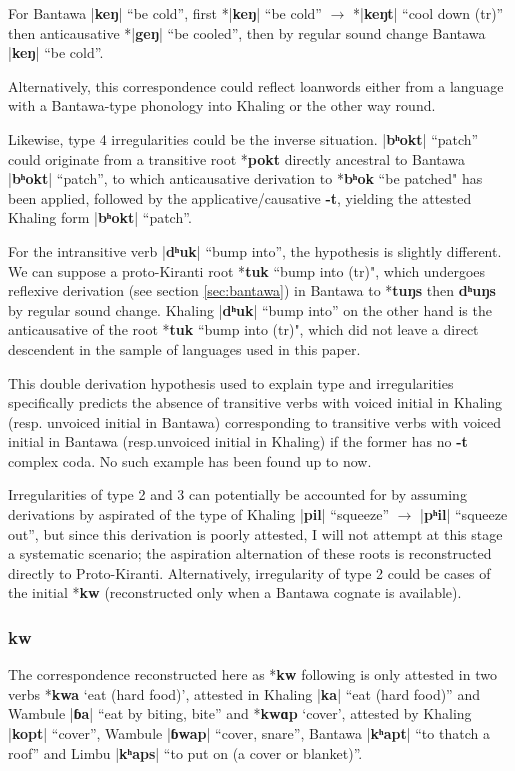 \documentclass[oldfontcommands,oneside,a4paper,11pt]{article}
\newcommand{\ipa}[1]{\textbf{{\phon\mbox{#1}}}} %
\newcommand{\dhatu}[2]{|\ipa{#1}| ``#2''}
\begin{document}
 For Bantawa \dhatu{keŋ}{be cold}, first *\dhatu{keŋ}{be cold} $\rightarrow$ *\dhatu{keŋt}{cool down (tr)} then anticausative *\dhatu{geŋ}{be cooled}, then by regular sound change Bantawa \dhatu{keŋ}{be cold}.
 
 Alternatively, this correspondence could reflect loanwords either from a language with a Bantawa-type phonology into Khaling or the other way round.
 
Likewise, type 4  irregularities could be the inverse situation. \dhatu{bʰokt}{patch} could originate from a transitive root *\ipa{pokt} directly ancestral to Bantawa \dhatu{bʰokt}{patch}, to which anticausative derivation to *\ipa{bʰok} ``be patched" has been applied, followed by the applicative/causative \ipa{-t}, yielding the attested Khaling form \dhatu{bʰokt}{patch}. 

For the intransitive verb \dhatu{dʰuk}{bump into}, the hypothesis is slightly different. We can suppose a proto-Kiranti root *\ipa{tuk} ``bump into (tr)", which undergoes reflexive derivation (see section \ref{sec:bantawa}) in Bantawa to *\ipa{tuŋs} then \ipa{dʰuŋs} by regular sound change. Khaling \dhatu{dʰuk}{bump into} on the other hand is the anticausative of the root *\ipa{tuk} ``bump into (tr)", which did not leave a direct descendent in the sample of languages used in this paper.
 
 This double derivation hypothesis used to explain type  and irregularities specifically predicts the absence of transitive verbs with voiced initial in Khaling (resp. unvoiced initial in Bantawa) corresponding to transitive verbs with voiced initial in Bantawa (resp.unvoiced initial in Khaling) if the former has no \ipa{-t} complex coda. No such example has been found up to now.
 
 Irregularities of type 2 and 3 can potentially be accounted for by assuming derivations by aspirated of the type of Khaling \dhatu{pil}{squeeze} $\rightarrow$ \dhatu{pʰil}{squeeze out}, but since this derivation is poorly attested, I will not attempt at this stage a systematic scenario; the aspiration alternation of these roots is reconstructed directly to Proto-Kiranti. Alternatively, irregularity of type  2 could be cases of the initial *\ipa{kw} (reconstructed only when a Bantawa cognate is available).

\subsubsection{\ipa{kw}}
The correspondence reconstructed here as *\ipa{kw} following \citet{opgenort04implosives} is only attested in two verbs *\ipa{kwa} `eat (hard food)', attested in Khaling \dhatu{ka}{eat (hard food)} and Wambule \dhatu{ɓa}{eat by biting, bite} and  *\ipa{kwɑp} `cover', attested by  Khaling \dhatu{kopt}{cover}, Wambule \dhatu{ɓwap}{cover, snare}, Bantawa \dhatu{kʰapt}{to thatch a roof} and Limbu  \dhatu{kʰaps}{to put on (a cover or blanket)}. 
 
\end{document}
